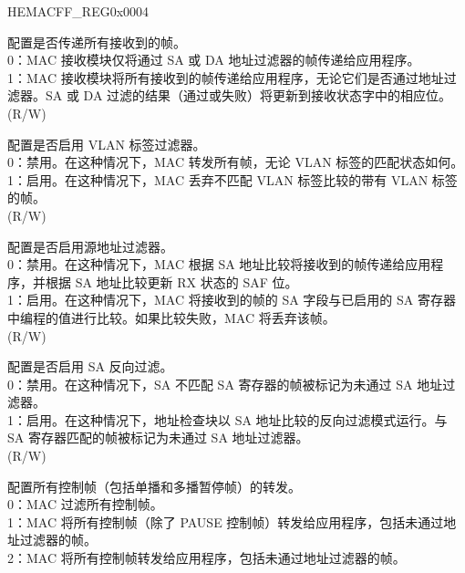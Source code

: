 \begin{register}{H}{EMACFF\_REG}{0x0004}\label{regdesc:EMACFFREG}
%
%
%
%
%
%
%
%
%
%
%
%
\regnewline%
\begin{regdesc}\begin{reglist}
\item [RECEIVE\_ALL] 配置是否传递所有接收到的帧。\\
0：MAC 接收模块仅将通过 SA 或 DA 地址过滤器的帧传递给应用程序。\\
1：MAC 接收模块将所有接收到的帧传递给应用程序，无论它们是否通过地址过滤器。SA 或 DA 过滤的结果（通过或失败）将更新到接收状态字中的相应位。\\(R/W)
\item [VTFE] 配置是否启用 VLAN 标签过滤器。\\
0：禁用。在这种情况下，MAC 转发所有帧，无论 VLAN 标签的匹配状态如何。\\
1：启用。在这种情况下，MAC 丢弃不匹配 VLAN 标签比较的带有 VLAN 标签的帧。\\
(R/W)
\item [SAFE] 配置是否启用源地址过滤器。\\
0：禁用。在这种情况下，MAC 根据 SA 地址比较将接收到的帧传递给应用程序，并根据 SA 地址比较更新 RX 状态的 SAF 位。\\
1：启用。在这种情况下，MAC 将接收到的帧的 SA 字段与已启用的 SA 寄存器中编程的值进行比较。如果比较失败，MAC 将丢弃该帧。\\(R/W)
\item [SAIF] 配置是否启用 SA 反向过滤。\\
0：禁用。在这种情况下，SA 不匹配 SA 寄存器的帧被标记为未通过 SA 地址过滤器。\\
1：启用。在这种情况下，地址检查块以 SA 地址比较的反向过滤模式运行。与 SA 寄存器匹配的帧被标记为未通过 SA 地址过滤器。\\(R/W)
\item [PCF] 配置所有控制帧（包括单播和多播暂停帧）的转发。\\
0：MAC 过滤所有控制帧。\\
1：MAC 将所有控制帧（除了 PAUSE 控制帧）转发给应用程序，包括未通过地址过滤器的帧。\\
2：MAC 将所有控制帧转发给应用程序，包括未通过地址过滤器的帧。\\

\end{reglist}
\end{regdesc}
\end{register}
